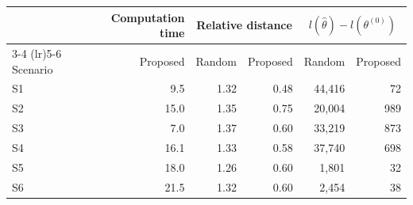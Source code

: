 \begin{tabular}{lrrrrr}
\toprule
 & Computation time & \multicolumn{2}{c}{Relative distance} & \multicolumn{2}{c}{$l(\hat{\theta}) - l(\theta^{(0)})$} \\
\cmidrule(lr){3-4} \cmidrule(lr){5-6}
Scenario & Proposed & Random & Proposed & Random & Proposed \\
\midrule
S1 & 9.5 & 1.32 & 0.48 & 44,416 & 72 \\
S2 & 15.0 & 1.35 & 0.75 & 20,004 & 989 \\
S3 & 7.0 & 1.37 & 0.60 & 33,219 & 873 \\
S4 & 16.1 & 1.33 & 0.58 & 37,740 & 698 \\
S5 & 18.0 & 1.26 & 0.60 & 1,801 & 32 \\
S6 & 21.5 & 1.32 & 0.60 & 2,454 & 38 \\
\bottomrule
\end{tabular}
